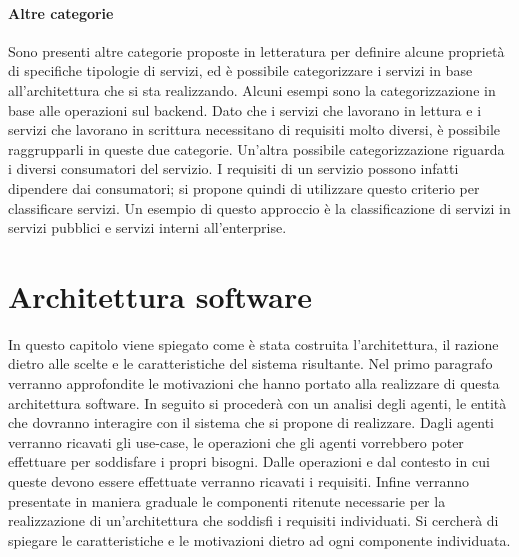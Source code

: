 \documentclass[12pt]{report}
\begin{document}
\subsubsection{Altre categorie}
Sono presenti altre categorie proposte in letteratura per definire alcune proprietà di specifiche tipologie di servizi, ed è possibile categorizzare i servizi in base all'architettura che si sta realizzando. 
Alcuni esempi sono la categorizzazione in base alle operazioni sul backend. 
Dato che i servizi che lavorano in lettura e i servizi che lavorano in scrittura necessitano di requisiti molto diversi, è possibile raggrupparli in queste due categorie.
Un'altra possibile categorizzazione riguarda i diversi consumatori del servizio. 
I requisiti di un servizio possono infatti dipendere dai consumatori; si propone quindi di utilizzare questo criterio per classificare servizi. 
Un esempio di questo approccio è la classificazione di servizi in servizi pubblici e  servizi interni all'enterprise.

\chapter{Architettura software}\label{architetturaLogica}
In questo capitolo viene spiegato come è stata costruita l'architettura, il razione dietro alle scelte e le caratteristiche del sistema risultante. 
Nel primo paragrafo verranno approfondite le motivazioni che hanno portato alla realizzare di questa architettura software.
In seguito si procederà con un analisi degli agenti, le entità che dovranno interagire con il sistema che si propone di realizzare.
Dagli agenti verranno ricavati gli use-case, le operazioni che gli agenti vorrebbero poter effettuare per soddisfare i propri bisogni.
Dalle operazioni e dal contesto in cui queste devono essere effettuate verranno ricavati i requisiti.
Infine verranno presentate in maniera graduale le componenti ritenute necessarie per la realizzazione di un'architettura che soddisfi i requisiti individuati. 
Si cercherà di spiegare le caratteristiche e le motivazioni dietro ad ogni componente individuata.
\end{document}
